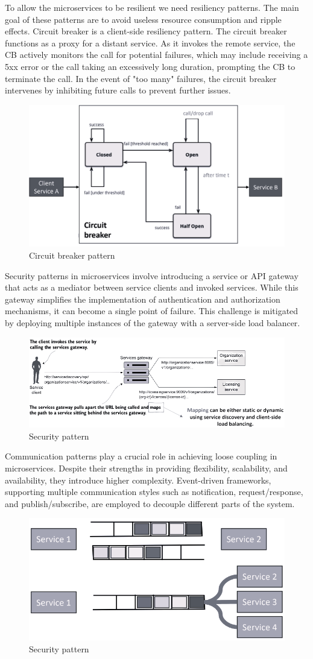 To allow the microservices to be resilient we need resiliency patterns. 
The main goal of these patterns are to avoid useless resource consumption and ripple effects. 
Circuit breaker is a client-side resiliency pattern. 
The circuit breaker functions as a proxy for a distant service. 
As it invokes the remote service, the CB actively monitors the call for potential failures, which may include receiving a 5xx error or the call taking an excessively long duration, prompting the CB to terminate the call.
In the event of "too many" failures, the circuit breaker intervenes by inhibiting future calls to prevent further issues.
\begin{figure}[H]
    \centering
    \includegraphics[width=0.5\linewidth]{images/cb.png}
    \caption{Circuit breaker pattern}
\end{figure}

Security patterns in microservices involve introducing a service or API gateway that acts as a mediator between service clients and invoked services. 
While this gateway simplifies the implementation of authentication and authorization mechanisms, it can become a single point of failure. 
This challenge is mitigated by deploying multiple instances of the gateway with a server-side load balancer.
\begin{figure}[H]
    \centering
    \includegraphics[width=0.75\linewidth]{images/sp.png}
    \caption{Security pattern}
\end{figure}

Communication patterns play a crucial role in achieving loose coupling in microservices. 
Despite their strengths in providing flexibility, scalability, and availability, they introduce higher complexity. 
Event-driven frameworks, supporting multiple communication styles such as notification, request/response, and publish/subscribe, are employed to decouple different parts of the system.
\begin{figure}[H]
    \centering
    \includegraphics[width=0.4\linewidth]{images/cp.png}
    \caption{Security pattern}
\end{figure}
\newpage